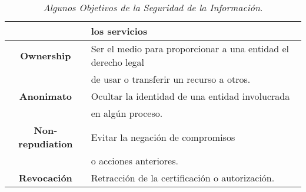 \documentclass[12pt]{article}
\begin{document}
\begin{table}[h]
\begin{tabular}{ c | l  }
		      & los servicios \\ \hline
\textbf{Ownership} & Ser el medio para proporcionar a una entidad el derecho legal \\ 
		  & de usar o transferir un recurso a otros. \\ \hline
\textbf{Anonimato} & Ocultar la identidad de una entidad involucrada \\ 
		   & en algún proceso. \\ \hline
\textbf{Non-repudiation} & Evitar la negación de compromisos \\ 
		         & o acciones anteriores. \\ \hline
\textbf{Revocación} & Retracción de la certificación o autorización. \\ \hline
	\end{tabular}
	\caption{\textit{Algunos Objetivos de la Seguridad de la Información}.}
\end{table}
\end{document}
